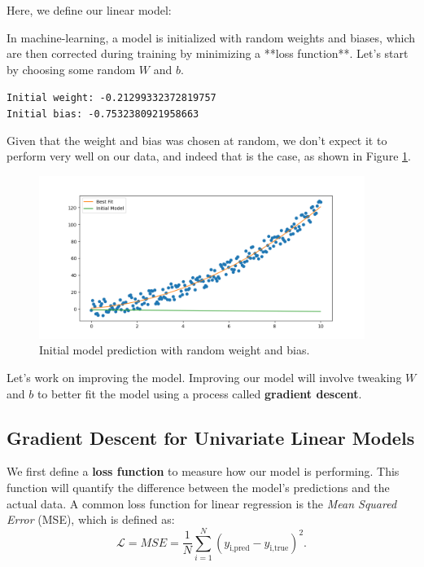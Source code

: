 Here, we define our linear model:



In machine-learning, a model is initialized with random weights and biases, which are then corrected during training by minimizing a **loss function**. Let's start by choosing some random $W$ and $b$.


\texttt{\small{Initial weight: -0.21299332372819757 \\
Initial bias: -0.7532380921958663
}}

Given that the weight and bias was chosen at random, we don't expect it to perform very well on our data, and indeed that is the case, as shown in Figure \ref{fig:linear2}.

\begin{figure}[h]
\centering
\includegraphics[width=300pt]{Regression/code/fig2.png}
\caption{Initial model prediction with random weight and bias.}
\label{fig:linear2}
\end{figure}

Let's work on improving the model. Improving our model will involve tweaking $W$ and $b$ to better fit the model using a process called \textbf{gradient descent}.

\subsection{Gradient Descent for Univariate Linear Models}
\label{subsec:2}
We first define a \textbf{loss function} to measure how our model is performing. This function will quantify the difference between the model's predictions and the actual data. A common loss function for linear regression is the \textit{Mean Squared Error} (MSE), which is defined as:
$$\mathcal{L} = MSE = \frac{1}{N}\sum_{i=1}^N\left(y_\text{i,pred} - y_\text{i,true}\right)^2.$$

